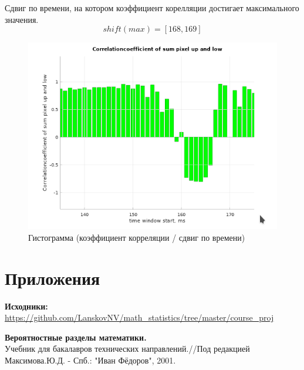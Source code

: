 \documentclass[12pt]{article}
\begin{document}
Сдвиг по времени, на котором коэффициент корелляции достигает максимального значения.
$$ shift(max) = [168, 169] $$

\begin{figure}[H]
\caption{Гистограмма (коэффициент корреляции / сдвиг по времени)}
\includegraphics[scale = 1]{plot4.png} 
\end{figure}

\section{Приложения}

\textbf{Исходники:} \\
\url{https://github.com/LanskovNV/math_statistics/tree/master/course_proj}


\begin{thebibliography}{}
    \textbf{Вероятностные разделы математики.} \\
    Учебник для бакалавров технических направлений.//Под редакцией Максимова.Ю.Д. - Спб.: "Иван Фёдоров", 2001.  
\end{thebibliography}
\end{document}

